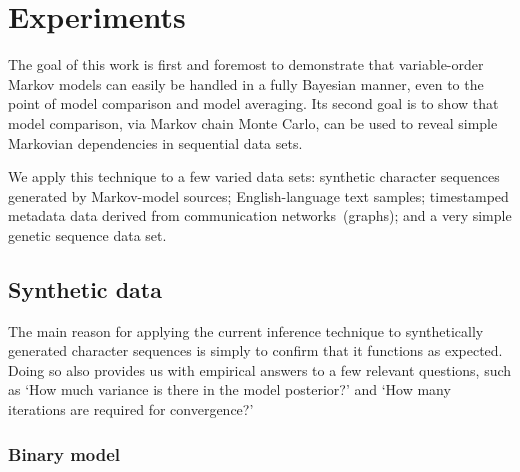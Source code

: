\documentclass[12pt,a4paper]{article}
\begin{document}
\section{Experiments} %

The goal of this work is first and foremost to demonstrate that variable-order
Markov models can easily be handled in a fully Bayesian manner, even to the
point of model comparison and model averaging. Its second goal is to show that
model comparison, via Markov chain Monte Carlo, can be used to reveal simple
Markovian dependencies in sequential data sets.

We apply this technique to a few varied data sets: synthetic character sequences
generated by Markov-model sources; English-language text samples; timestamped
metadata data derived from communication networks~(graphs); and a very simple
genetic sequence data set.

\subsection{Synthetic data}\label{sec:synthetic} %

The main reason for applying the current inference technique to synthetically
generated character sequences is simply to confirm that it functions as
expected. Doing so also provides us with empirical answers to a few relevant
questions, such as `How much variance is there in the model posterior?' and `How
many iterations are required for convergence?'

\subsubsection{Binary model} %
\end{document}
